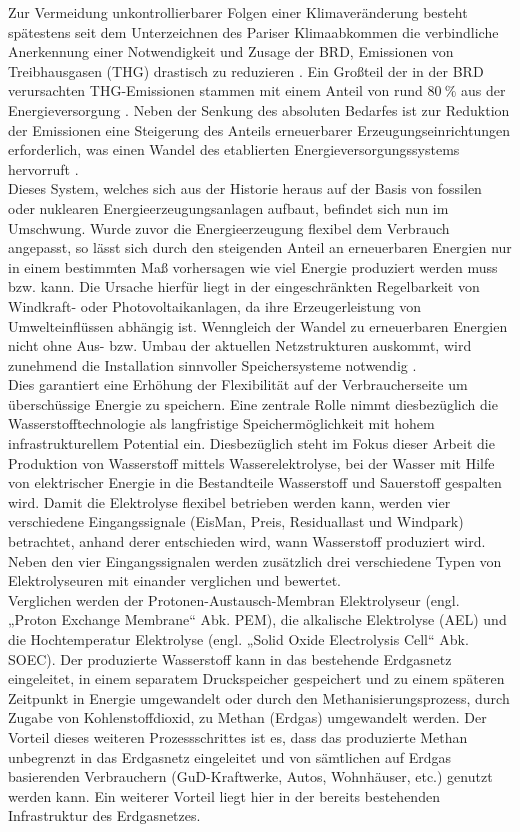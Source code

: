 \documentclass[onecolumn,10pt,titlepage]{article}
\begin{document}
Zur Vermeidung unkontrollierbarer Folgen einer Klimaveränderung besteht spätestens seit dem Unterzeichnen des Pariser Klimaabkommen die verbindliche Anerkennung einer Notwendigkeit und Zusage der BRD, Emissionen von Treibhausgasen (THG) drastisch zu reduzieren \cite{Umweltbundesamt.}. Ein Großteil der in der BRD verursachten THG-Emissionen stammen mit einem Anteil von rund $80~\%$ aus der Energieversorgung \cite{Umweltbundesamt.}. Neben der Senkung des absoluten Bedarfes ist zur Reduktion der Emissionen eine Steigerung des Anteils erneuerbarer Erzeugungseinrichtungen erforderlich, was einen Wandel des etablierten Energieversorgungssystems hervorruft  \cite{Hey.26.Oktober2012}.\\
 Dieses System, welches sich aus der Historie heraus auf der Basis von fossilen oder nuklearen Energieerzeugungsanlagen aufbaut, befindet sich nun im Umschwung. Wurde zuvor die Energieerzeugung flexibel dem Verbrauch angepasst, so lässt sich durch den steigenden Anteil an erneuerbaren Energien nur in einem bestimmten Maß vorhersagen wie viel Energie produziert werden muss bzw. kann. Die Ursache hierfür liegt in der eingeschränkten Regelbarkeit von Windkraft- oder Photovoltaikanlagen, da ihre Erzeugerleistung von Umwelteinflüssen abhängig ist. Wenngleich der Wandel zu erneuerbaren Energien nicht ohne Aus- bzw. Umbau der aktuellen Netzstrukturen auskommt, wird zunehmend die Installation sinnvoller Speichersysteme notwendig \cite{Umweltbundesamt.}.\\
  Dies garantiert eine Erhöhung der Flexibilität auf der Verbraucherseite um überschüssige Energie zu speichern. Eine zentrale Rolle nimmt diesbezüglich die Wasserstofftechnologie als langfristige Speichermöglichkeit mit hohem infrastrukturellem Potential ein.
Diesbezüglich steht im Fokus dieser Arbeit die Produktion von Wasserstoff mittels Wasserelektrolyse, bei der Wasser mit Hilfe von elektrischer Energie in die Bestandteile Wasserstoff und Sauerstoff gespalten wird. Damit die Elektrolyse flexibel betrieben werden kann, werden vier verschiedene Eingangssignale (EisMan, Preis, Residuallast und Windpark) betrachtet, anhand derer entschieden wird, wann Wasserstoff produziert wird. Neben den vier Eingangssignalen werden zusätzlich drei verschiedene Typen von Elektrolyseuren mit einander verglichen und bewertet.\\
Verglichen werden der Protonen-Austausch-Membran Elektrolyseur (engl. „Proton Exchange Membrane“ Abk. PEM), die alkalische Elektrolyse (AEL) und die Hochtemperatur Elektrolyse (engl. „Solid Oxide Electrolysis Cell“ Abk. SOEC).  Der produzierte Wasserstoff kann in das bestehende Erdgasnetz eingeleitet, in einem separatem Druckspeicher gespeichert und zu einem späteren Zeitpunkt in Energie umgewandelt oder durch den Methanisierungsprozess, durch Zugabe von Kohlenstoffdioxid, zu Methan (Erdgas) umgewandelt werden. Der Vorteil dieses weiteren Prozessschrittes ist es, dass das produzierte Methan unbegrenzt in das Erdgasnetz eingeleitet und von sämtlichen auf Erdgas basierenden Verbrauchern (GuD-Kraftwerke, Autos, Wohnhäuser, etc.) genutzt werden kann. Ein weiterer Vorteil liegt hier in der bereits bestehenden Infrastruktur des Erdgasnetzes.
\end{document}
